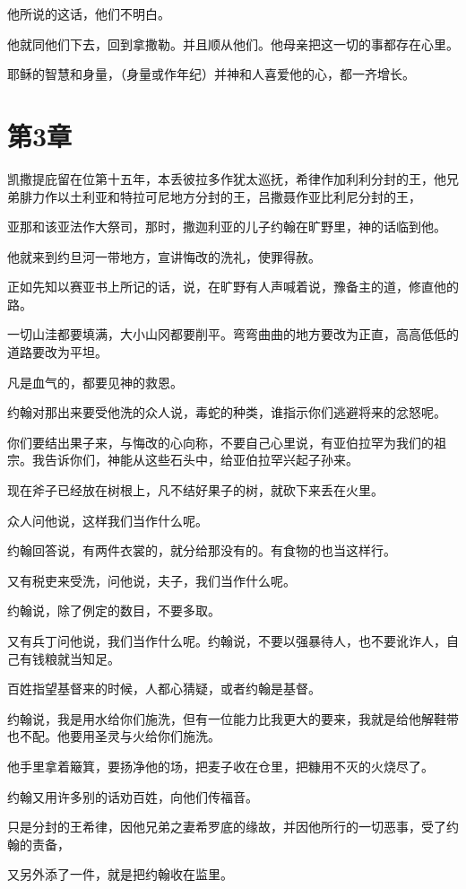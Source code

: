 \documentclass[12pt,oneside]{book}
\begin{document}
他所说的这话，他们不明白。

他就同他们下去，回到拿撒勒。并且顺从他们。他母亲把这一切的事都存在心里。

耶稣的智慧和身量，（身量或作年纪）并神和人喜爱他的心，都一齐增长。

\chapter{第3章}
凯撒提庇留在位第十五年，本丢彼拉多作犹太巡抚，希律作加利利分封的王，他兄弟腓力作以土利亚和特拉可尼地方分封的王，吕撒聂作亚比利尼分封的王，

亚那和该亚法作大祭司，那时，撒迦利亚的儿子约翰在旷野里，神的话临到他。

他就来到约旦河一带地方，宣讲悔改的洗礼，使罪得赦。

正如先知以赛亚书上所记的话，说，在旷野有人声喊着说，豫备主的道，修直他的路。

一切山洼都要填满，大小山冈都要削平。弯弯曲曲的地方要改为正直，高高低低的道路要改为平坦。

凡是血气的，都要见神的救恩。

约翰对那出来要受他洗的众人说，毒蛇的种类，谁指示你们逃避将来的忿怒呢。

你们要结出果子来，与悔改的心向称，不要自己心里说，有亚伯拉罕为我们的祖宗。我告诉你们，神能从这些石头中，给亚伯拉罕兴起子孙来。

现在斧子已经放在树根上，凡不结好果子的树，就砍下来丢在火里。

众人问他说，这样我们当作什么呢。

约翰回答说，有两件衣裳的，就分给那没有的。有食物的也当这样行。

又有税吏来受洗，问他说，夫子，我们当作什么呢。

约翰说，除了例定的数目，不要多取。

又有兵丁问他说，我们当作什么呢。约翰说，不要以强暴待人，也不要讹诈人，自己有钱粮就当知足。

百姓指望基督来的时候，人都心猜疑，或者约翰是基督。

约翰说，我是用水给你们施洗，但有一位能力比我更大的要来，我就是给他解鞋带也不配。他要用圣灵与火给你们施洗。

他手里拿着簸箕，要扬净他的场，把麦子收在仓里，把糠用不灭的火烧尽了。

约翰又用许多别的话劝百姓，向他们传福音。

只是分封的王希律，因他兄弟之妻希罗底的缘故，并因他所行的一切恶事，受了约翰的责备，

又另外添了一件，就是把约翰收在监里。
\end{document}
